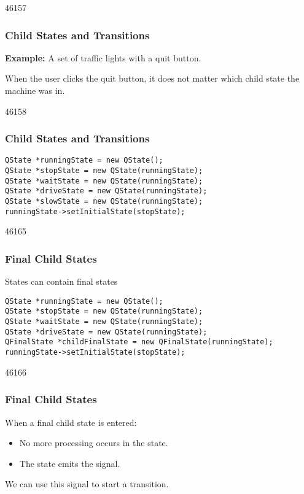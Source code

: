 \begin{slide}{46157}\frametitle{Child States and Transitions}
\textbf{Example:} A set of traffic lights with a quit button.


\vspace*{0.5em}
When the user clicks the quit button, it does not matter which child state
the machine was in.
\end{slide}

\begin{slide}[fragile]{46158}\frametitle{Child States and Transitions}
\vspace*{1.5em}
\small
\begin{lstlisting}
QState *runningState = new QState();
QState *stopState = new QState(runningState);
QState *waitState = new QState(runningState);
QState *driveState = new QState(runningState);
QState *slowState = new QState(runningState);
runningState->setInitialState(stopState);
\end{lstlisting}
\normalsize
{}
\vfill
\end{slide}

\begin{slide}[fragile]{46165}\frametitle{Final Child States}
States can contain final states

\vspace*{1.0em}
\vfill
\small
\begin{lstlisting}
QState *runningState = new QState();
QState *stopState = new QState(runningState);
QState *waitState = new QState(runningState);
QState *driveState = new QState(runningState);
QFinalState *childFinalState = new QFinalState(runningState);
runningState->setInitialState(stopState);
\end{lstlisting}
\normalsize
\end{slide}

\begin{slide}{46166}\frametitle{Final Child States}
\vfill
When a final child state is entered:
\begin{itemize}
\item No more processing occurs in the state.
\item The state emits the  signal.
\end{itemize}

We can use this signal to start a transition.
\end{slide}


